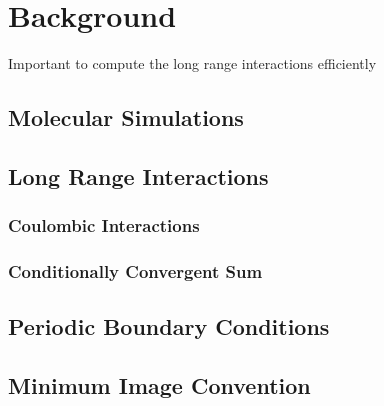 \section{Background}
Important to compute the long range interactions efficiently
\subsection*{Molecular Simulations}
\subsection*{Long Range Interactions}
\subsubsection*{Coulombic Interactions}
\subsubsection*{Conditionally Convergent Sum}
\subsection*{Periodic Boundary Conditions}
\subsection*{Minimum Image Convention}